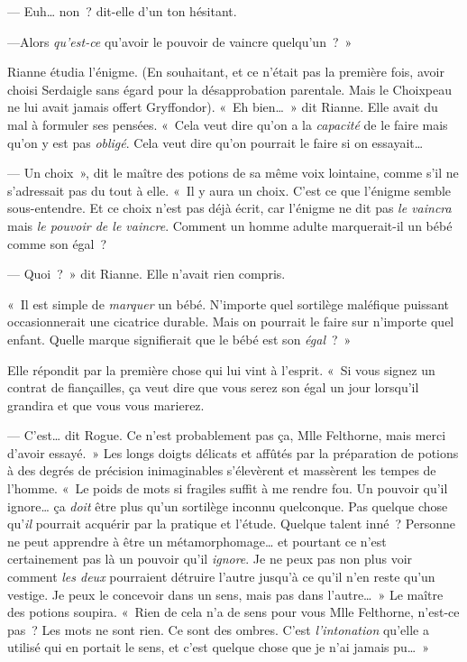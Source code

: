 --- Euh… non~? dit-elle d'un ton hésitant.

---Alors \emph{qu'est-ce} qu'avoir le pouvoir de vaincre quelqu'un~?~»

Rianne étudia l'énigme. (En souhaitant, et ce n'était pas la première fois, avoir choisi Serdaigle sans égard pour la désapprobation parentale. Mais le Choixpeau ne lui avait jamais offert Gryffondor). «~Eh bien…~» dit Rianne. Elle avait du mal à formuler ses pensées. «~Cela veut dire qu'on a la \emph{capacité} de le faire mais qu'on y est pas \emph{obligé}. Cela veut dire qu'on pourrait le faire si on essayait…

--- Un choix~», dit le maître des potions de sa même voix lointaine, comme s'il ne s'adressait pas du tout à elle. «~Il y aura un choix. C'est ce que l'énigme semble sous-entendre. Et ce choix n'est pas déjà écrit, car l'énigme ne dit pas \emph{le vaincra} mais \emph{le pouvoir de le vaincre}. Comment un homme adulte marquerait-il un bébé comme son égal~?

--- Quoi~?~» dit Rianne. Elle n'avait rien compris.

«~Il est simple de \emph{marquer} un bébé. N'importe quel sortilège maléfique puissant occasionnerait une cicatrice durable. Mais on pourrait le faire sur n'importe quel enfant. Quelle marque signifierait que le bébé est son \emph{égal}~?~»

Elle répondit par la première chose qui lui vint à l'esprit. «~Si vous signez un contrat de fiançailles, ça veut dire que vous serez son égal un jour lorsqu'il grandira et que vous vous marierez.

--- C'est… dit Rogue. Ce n'est probablement pas ça, Mlle Felthorne, mais merci d'avoir essayé.~» Les longs doigts délicats et affûtés par la préparation de potions à des degrés de précision inimaginables s'élevèrent et massèrent les tempes de l'homme. «~Le poids de mots si fragiles suffit à me rendre fou. Un pouvoir qu'il ignore… ça \emph{doit} être plus qu'un sortilège inconnu quelconque. Pas quelque chose qu'\emph{il} pourrait acquérir par la pratique et l'étude. Quelque talent inné~? Personne ne peut apprendre à être un métamorphomage… et pourtant ce n'est certainement pas là un pouvoir qu'il \emph{ignore}. Je ne peux pas non plus voir comment \emph{les deux} pourraient détruire l'autre jusqu'à ce qu'il n'en reste qu'un vestige. Je peux le concevoir dans un sens, mais pas dans l'autre…~» Le maître des potions soupira. «~Rien de cela n'a de sens pour vous Mlle Felthorne, n'est-ce pas~? Les mots ne sont rien. Ce sont des ombres. C'est \emph{l'intonation} qu'elle a utilisé qui en portait le sens, et c'est quelque chose que je n'ai jamais pu…~»

